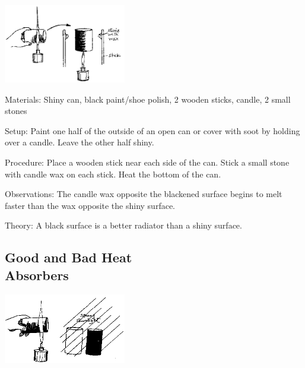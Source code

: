 \begin{multicols}{2}
\begin{center}
\includegraphics[width=0.4\textwidth]{./img/source/good-bad-radiators.png}
\end{center}

\begin{description*}
\item[Materials:]{Shiny can, black paint/shoe polish, 2 wooden sticks, candle, 2 small stones}
\item[Setup:]{Paint one half of the outside of an open can or cover with soot by holding over a candle. Leave the other half shiny.}
\item[Procedure:]{Place a wooden stick near each side of the can. Stick a small stone with candle wax on each stick. Heat the bottom of the can.}
\item[Observations:]{The candle wax opposite the blackened surface begins to melt faster than the wax opposite the shiny surface.}
\item[Theory:]{A black surface is a better radiator than a shiny surface.}
\end{description*}

\subsection[Good and Bad Heat Absorbers]{Good and Bad Heat \hfill \\ Absorbers}

\begin{center}
\includegraphics[width=0.4\textwidth]{./img/source/good-bad-absorbers.png}
\end{center}


\end{multicols}
